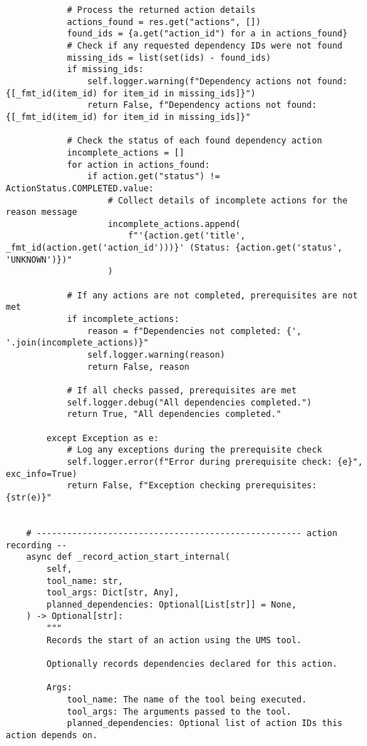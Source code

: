 \documentclass[12pt,a4paper]{article}
\begin{document}
\begin{pageablecode}
\begin{verbatim}
            # Process the returned action details
            actions_found = res.get("actions", [])
            found_ids = {a.get("action_id") for a in actions_found}
            # Check if any requested dependency IDs were not found
            missing_ids = list(set(ids) - found_ids)
            if missing_ids:
                self.logger.warning(f"Dependency actions not found: {[_fmt_id(item_id) for item_id in missing_ids]}")
                return False, f"Dependency actions not found: {[_fmt_id(item_id) for item_id in missing_ids]}"

            # Check the status of each found dependency action
            incomplete_actions = []
            for action in actions_found:
                if action.get("status") != ActionStatus.COMPLETED.value:
                    # Collect details of incomplete actions for the reason message
                    incomplete_actions.append(
                        f"'{action.get('title', _fmt_id(action.get('action_id')))}' (Status: {action.get('status', 'UNKNOWN')})"
                    )

            # If any actions are not completed, prerequisites are not met
            if incomplete_actions:
                reason = f"Dependencies not completed: {', '.join(incomplete_actions)}"
                self.logger.warning(reason)
                return False, reason

            # If all checks passed, prerequisites are met
            self.logger.debug("All dependencies completed.")
            return True, "All dependencies completed."

        except Exception as e:
            # Log any exceptions during the prerequisite check
            self.logger.error(f"Error during prerequisite check: {e}", exc_info=True)
            return False, f"Exception checking prerequisites: {str(e)}"


    # ---------------------------------------------------- action recording --
    async def _record_action_start_internal(
        self,
        tool_name: str,
        tool_args: Dict[str, Any],
        planned_dependencies: Optional[List[str]] = None,
    ) -> Optional[str]:
        """
        Records the start of an action using the UMS tool.

        Optionally records dependencies declared for this action.

        Args:
            tool_name: The name of the tool being executed.
            tool_args: The arguments passed to the tool.
            planned_dependencies: Optional list of action IDs this action depends on.


\end{verbatim}
\end{pageablecode}
\end{document}
